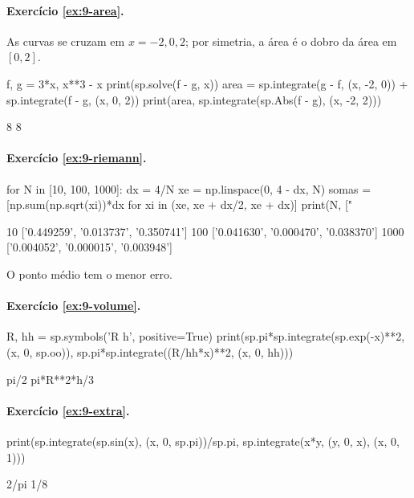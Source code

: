 \paragraph{Exercício \ref{ex:9-area}.} As curvas se cruzam em $x=-2,0,2$; por simetria, a área é o dobro da área
em $[0,2]$.
\begin{entrada}
f, g = 3*x, x**3 - x
print(sp.solve(f - g, x))
area = sp.integrate(g - f, (x, -2, 0)) + sp.integrate(f - g, (x, 0, 2))
print(area, sp.integrate(sp.Abs(f - g), (x, -2, 2)))
\end{entrada}
\begin{saida}
[-2, 0, 2]
8 8
\end{saida}

\paragraph{Exercício \ref{ex:9-riemann}.}
\begin{entrada}
for N in [10, 100, 1000]:
    dx = 4/N
    xe = np.linspace(0, 4 - dx, N)
    somas = [np.sum(np.sqrt(xi))*dx for xi in (xe, xe + dx/2, xe + dx)]
    print(N, ["%
\end{entrada}
\begin{saida}
10 ['0.449259', '0.013737', '0.350741']
100 ['0.041630', '0.000470', '0.038370']
1000 ['0.004052', '0.000015', '0.003948']
\end{saida}

O ponto médio tem o menor erro.

\paragraph{Exercício \ref{ex:9-volume}.}
\begin{entrada}
R, hh = sp.symbols('R h', positive=True)
print(sp.pi*sp.integrate(sp.exp(-x)**2, (x, 0, sp.oo)), sp.pi*sp.integrate((R/hh*x)**2, (x, 0, hh)))
\end{entrada}
\begin{saida}
pi/2 pi*R**2*h/3
\end{saida}

\paragraph{Exercício \ref{ex:9-extra}.}
\begin{entrada}
print(sp.integrate(sp.sin(x), (x, 0, sp.pi))/sp.pi, sp.integrate(x*y, (y, 0, x), (x, 0, 1)))
\end{entrada}
\begin{saida}
2/pi 1/8
\end{saida}

